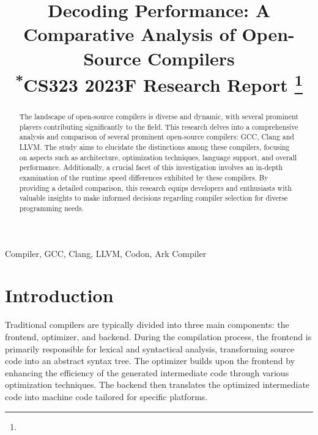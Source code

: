 \documentclass[conference]{IEEEtran}
\begin{document}
\title{Decoding Performance: A Comparative Analysis of Open-Source Compilers\\
{\footnotesize \textsuperscript{*}CS323 2023F Research Report}
\thanks{}
}

\author{
\and
{}
\and
{}
}
\maketitle

\begin{abstract}
The landscape of open-source compilers is diverse and dynamic, with several prominent players contributing significantly to the field. This research delves into a comprehensive analysis and comparison of several prominent open-source compilers: GCC, Clang and LLVM. The study aims to elucidate the distinctions among these compilers, focusing on aspects such as architecture, optimization techniques, language support, and overall performance. Additionally, a crucial facet of this investigation involves an in-depth examination of the runtime speed differences exhibited by these compilers. By providing a detailed comparison, this research equips developers and enthusiasts with valuable insights to make informed decisions regarding compiler selection for diverse programming needs.
\end{abstract}

\begin{IEEEkeywords}
Compiler, GCC, Clang, LLVM, Codon, Ark Compiler
\end{IEEEkeywords}

\section{Introduction}
Traditional compilers are typically divided into three main components: the frontend, optimizer, and backend. During the compilation process, the frontend is primarily responsible for lexical and syntactical analysis, transforming source code into an abstract syntax tree. The optimizer builds upon the frontend by enhancing the efficiency of the generated intermediate code through various optimization techniques. The backend then translates the optimized intermediate code into machine code tailored for specific platforms.
\end{document}
